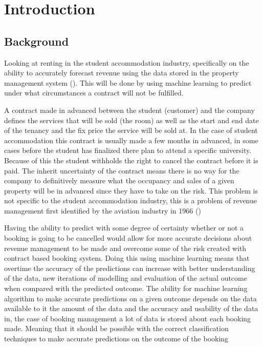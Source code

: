\chapter{Introduction}

\section{Background}
Looking at renting in the student accommodation industry, specifically on the ability to accurately forecast revenue using the data stored in the property management system (\cite{Jain2006IntellectualPerspective}). This will be done by using machine learning to predict under what circumstances a contract will not be fulfilled.

\vspace{5mm}

A contract made in advanced between the student (customer) and the company defines the services that will be sold (the room) as well as the start and end date of the tenancy and the fix price the service will be sold at. In the case of student accommodation this contract is usually made a few months in advanced, in some cases before the student has finalized there plan to attend a specific university. Because of this the student withholds the right to cancel the contract before it is paid. The inherit uncertainty of the contract means there is no way for the company to definitively measure what the occupancy and sales of a given property will be in advanced since they have to take on the risk. This problem is not specific to the student accommodation industry, this is a problem of revenue management first identified by the aviation industry in 1966  (\cite{Chiang2007AnResearch})

\vspace{5mm}


Having the ability to predict with some degree of certainty whether or not a booking is going to be cancelled would allow for more accurate decisions about revenue management to be made and overcome some of the risk created with contract based booking system. Doing this using machine learning means that overtime the accuracy of the predictions can increase with better understanding of the data, new iterations of modelling and evaluation of the actual outcome when compared with the predicted outcome. The ability for machine learning algorithm to make accurate predictions on a given outcome depends on the data available to it the amount of the data and the accuracy and usability of the data in, the case of booking management a lot of data is stored about each booking made. Meaning that it should be possible with the correct classification techniques to make accurate predictions on the outcome of the booking


